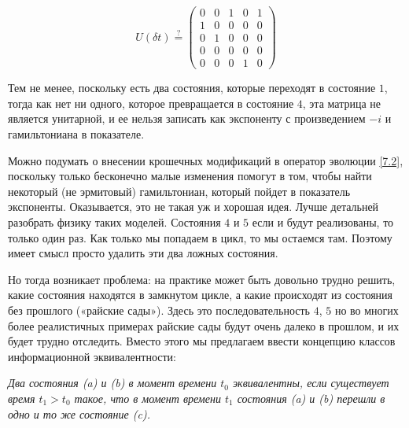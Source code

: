 \documentclass[main.tex]{subfiles}
\begin{document}
\begin{equation}\label{7.2}
	U(\delta t) \stackrel{?}{=}\left(\begin{array}{ccccc}{0} & {0} & {1} & {0} & {1} \\ {1} & {0} & {0} & {0} & {0} \\ {0} & {1} & {0} & {0} & {0} \\ {0} & {0} & {0} & {0} & {0} \\ {0} & {0} & {0} & {1} & {0}\end{array}\right)
\end{equation}

Тем не менее, поскольку есть два состояния, которые переходят в состояние $ 1$, тогда как нет ни одного, которое превращается в состояние $ 4$, эта матрица не является унитарной, и ее нельзя записать как экспоненту с произведением $-i$ и гамильтониана в показателе.

Можно подумать о внесении крошечных модификаций в оператор эволюции \ref{7.2}, поскольку только бесконечно малые изменения помогут в том, чтобы найти некоторый (не эрмитовый) гамильтониан, который пойдет в показатель экспоненты. Оказывается, это не такая уж и хорошая идея. Лучше детальней разобрать физику таких моделей. Состояния $ 4$ и $ 5$ если и будут реализованы, то только один раз. Как только мы попадаем в цикл, то мы остаемся там. Поэтому имеет смысл просто удалить эти два ложных состояния.

Но тогда возникает проблема: на практике может быть довольно трудно решить, какие состояния находятся в замкнутом цикле, а какие происходят из состояния без прошлого («райские сады»). Здесь это последовательность $4$, $5$ но во многих более реалистичных примерах райские сады будут очень далеко в прошлом, и их будет трудно отследить. Вместо этого мы предлагаем ввести концепцию классов информационной эквивалентности:

  
\textit{Два состояния (a) и (b) в момент времени $t_0$ эквивалентны, если существует время $t_1> t_0$ такое, что в момент времени $t_1$ состояния (a) и (b) перешли в одно и то же состояние (c).}
  
\end{document}
